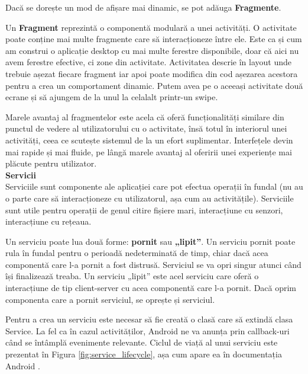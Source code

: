 \documentclass[12pt,a4paper]{article}
\begin{document}
Dacă se dorește un mod de afișare mai dinamic, se pot adăuga \textbf{Fragmente}.

Un \textbf{Fragment} reprezintă o componentă modulară a unei activități. O activitate poate conține mai multe fragmente care să interacționeze între ele. Este ca și cum am construi o aplicație desktop cu mai multe ferestre disponibile, doar că aici nu avem ferestre efective, ci zone din activitate. Activitatea descrie în layout unde trebuie așezat fiecare fragment iar apoi poate modifica din cod așezarea acestora pentru a crea un comportament dinamic. Putem avea pe o aceeași activitate două ecrane și să ajungem de la unul la celalalt printr-un swipe.

Marele avantaj al fragmentelor este acela că oferă funcționalități similare din punctul de vedere al utilizatorului cu o activitate, însă totul în interiorul unei activități, ceea ce scutește sistemul de la un efort suplimentar. Interfețele devin mai rapide și mai fluide, pe lângă marele avantaj al oferirii unei experiențe mai plăcute pentru utilizator.\\

\textbf{Servicii}\\
Serviciile sunt componente ale aplicației care pot efectua operații în fundal (nu au o parte care să interacționeze cu utilizatorul, așa cum au activitățile). Serviciile sunt utile pentru operații de genul citire fișiere mari, interacțiune cu senzori, interacțiune cu rețeaua.

Un serviciu poate lua două forme: \textbf{pornit} sau \textbf{„lipit”}. Un serviciu pornit poate rula în fundal pentru o perioadă nedeterminată de timp, chiar dacă acea componentă care l-a pornit a fost distrusă. Serviciul se va opri singur atunci când își finalizează treaba. Un serviciu „lipit” este acel serviciu care oferă o interacțiune de tip client-server cu acea componentă care l-a pornit. Dacă oprim componenta care a pornit serviciul, se oprește și serviciul.

Pentru a crea un serviciu este necesar să fie creată o clasă care să extindă clasa Service. La fel ca în cazul activităților, Android ne va anunța prin callback-uri când se întâmplă evenimente relevante. Ciclul de viață al unui serviciu este prezentat în Figura \ref{fig:service_lifecycle}, așa cum apare ea în documentația Android \cite{DeveloperAndroid}.\\
\end{document}
